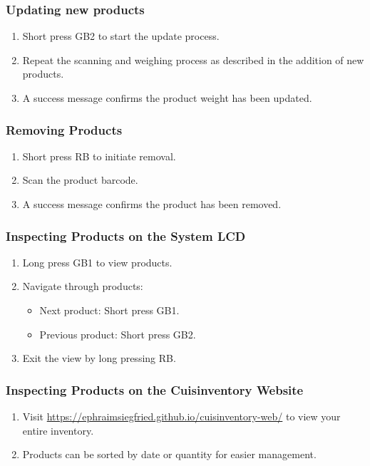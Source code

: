 \documentclass{article}
\begin{document}
\subsubsection{Updating new products}
\begin{enumerate}
	\item Short press GB2 to start the update process.
	\item Repeat the scanning and weighing process as described in the addition of new products.
	\item A success message confirms the product weight has been updated.
\end{enumerate}

\subsubsection{Removing Products}
\begin{enumerate}
	\item Short press RB to initiate removal.
	\item Scan the product barcode.
	\item A success message confirms the product has been removed.
\end{enumerate}

\subsubsection{Inspecting Products on the System LCD}
\begin{enumerate}
	\item Long press GB1 to view products.
	\item Navigate through products:
	      \begin{itemize}
		      \item Next product: Short press GB1.
		      \item Previous product: Short press GB2.
	      \end{itemize}
	\item Exit the view by long pressing RB.
\end{enumerate}

\subsubsection{Inspecting Products on the Cuisinventory Website}
\begin{enumerate}
	\item Visit \url{https://ephraimsiegfried.github.io/cuisinventory-web/} to view your entire inventory.
	\item Products can be sorted by date or quantity for easier management.
\end{enumerate}
\end{document}
